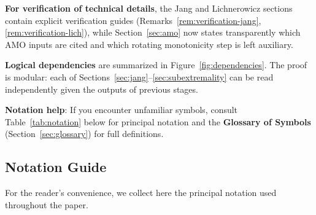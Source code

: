 \textbf{For verification of technical details}, the Jang and Lichnerowicz sections contain explicit verification guides (Remarks~\ref{rem:verification-jang}, \ref{rem:verification-lich}), while Section~\ref{sec:amo} now states transparently which AMO inputs are cited and which rotating monotonicity step is left auxiliary.

\textbf{Logical dependencies} are summarized in Figure~\ref{fig:dependencies}. The proof is modular: each of Sections~\ref{sec:jang}--\ref{sec:subextremality} can be read independently given the outputs of previous stages.

\textbf{Notation help}: If you encounter unfamiliar symbols, consult Table~\ref{tab:notation} below for principal notation and the \textbf{Glossary of Symbols} (Section~\ref{sec:glossary}) for full definitions.

\subsection{Notation Guide}

For the reader's convenience, we collect here the principal notation used throughout the paper.

